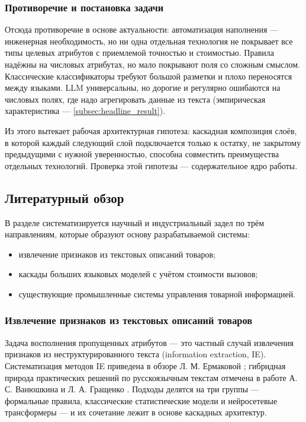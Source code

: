 \subsubsection{Противоречие и постановка задачи}

Отсюда противоречие в основе актуальности: автоматизация наполнения — инженерная необходимость, но ни одна отдельная технология не покрывает все типы целевых атрибутов с приемлемой точностью и стоимостью. Правила надёжны на числовых атрибутах, но мало покрывают поля со сложным смыслом. Классические классификаторы требуют большой разметки и плохо переносятся между языками. LLM универсальны, но дорогие \cite{ref_9} и регулярно ошибаются на числовых полях, где надо агрегировать данные из текста (эмпирическая характеристика — \ref{subsec:headline_result}).

Из этого вытекает рабочая архитектурная гипотеза: каскадная композиция слоёв, в которой каждый следующий слой подключается только к остатку, не закрытому предыдущими с нужной уверенностью, способна совместить преимущества отдельных технологий. Проверка этой гипотезы — содержательное ядро работы.

\subsection{Литературный обзор}

В разделе систематизируется научный и индустриальный задел по трём направлениям, которые образуют основу разрабатываемой системы:

\begin{itemize}
    \item извлечение признаков из текстовых описаний товаров;
    \item каскады больших языковых моделей с учётом стоимости вызовов;
    \item существующие промышленные системы управления товарной информацией.
\end{itemize}

\subsubsection{Извлечение признаков из текстовых описаний товаров}

Задача восполнения пропущенных атрибутов — это частный случай извлечения признаков из неструктурированного текста (information extraction, IE). Систематизация методов IE приведена в обзоре Л. М. Ермаковой \cite{ref_51}; гибридная природа практических решений по русскоязычным текстам отмечена в работе А. С. Ванюшкина и Л. А. Гращенко \cite{ref_52}. Подходы делятся на три группы — формальные правила, классические статистические модели и нейросетевые трансформеры — и их сочетание лежит в основе каскадных архитектур.

